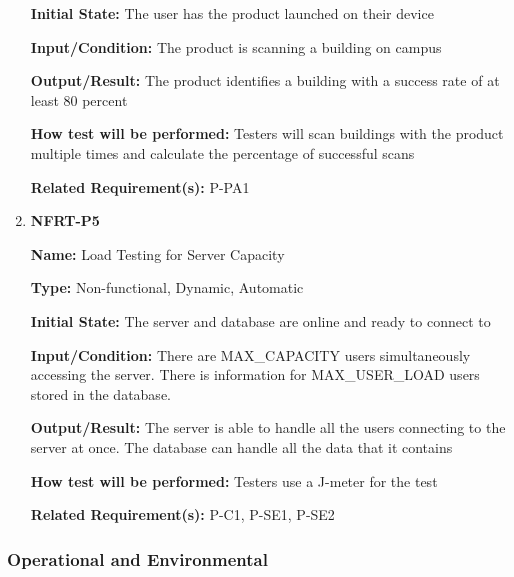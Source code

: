 \documentclass[12pt, titlepage]{article}
\begin{document}
\begin{enumerate}
\textbf{Initial State:} The user has the product launched on their device

\textbf{Input/Condition:} The product is scanning a building on campus

\textbf{Output/Result:} The product identifies a building with a success rate of at least 80 percent

\textbf{How test will be performed:} Testers will scan buildings with the product multiple times and calculate the percentage of successful scans

\textbf{Related Requirement(s):} P-PA1

\item{\textbf{NFRT-P5}}

\textbf{Name:} Load Testing for Server Capacity

\textbf{Type:} Non-functional, Dynamic, Automatic
					
\textbf{Initial State:} The server and database are online and ready to connect to

\textbf{Input/Condition:} There are MAX\_CAPACITY users simultaneously accessing the server. There is information for MAX\_USER\_LOAD users stored in the database.

\textbf{Output/Result:} The server is able to handle all the users connecting to the server at once. The database can handle all the data that it contains

\textbf{How test will be performed:} Testers use a J-meter for the test

\textbf{Related Requirement(s):} P-C1, P-SE1, P-SE2

\end{enumerate}

\subsubsection{Operational and Environmental}
\end{document}
